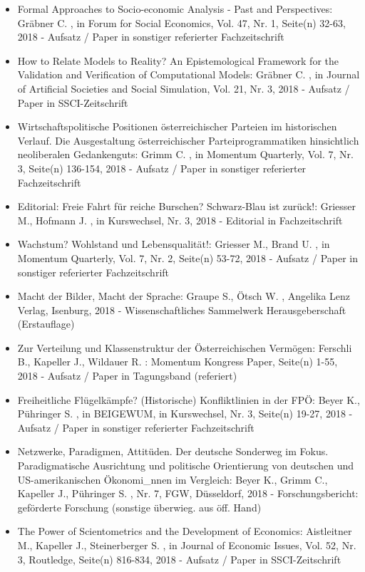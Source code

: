 \begin{itemize}
	 \item Formal Approaches to Socio-economic Analysis - Past and Perspectives: Gräbner C. , in Forum for Social Economics, Vol. 47, Nr. 1, Seite(n) 32-63, 2018 - Aufsatz / Paper in sonstiger referierter Fachzeitschrift
	 \item How to Relate Models to Reality? An Epistemological Framework for the Validation and Verification of Computational Models: Gräbner C. , in Journal of Artificial Societies and Social Simulation, Vol. 21, Nr. 3, 2018 - Aufsatz / Paper in SSCI-Zeitschrift
	 \item Wirtschaftspolitische Positionen österreichischer Parteien im historischen Verlauf. Die Ausgestaltung österreichischer Parteiprogrammatiken hinsichtlich neoliberalen Gedankenguts: Grimm C. , in Momentum Quarterly, Vol. 7, Nr. 3, Seite(n) 136-154, 2018 - Aufsatz / Paper in sonstiger referierter Fachzeitschrift
	 \item Editorial: Freie Fahrt für reiche Burschen? Schwarz-Blau ist zurück!: Griesser M., Hofmann J. , in Kurswechsel, Nr. 3, 2018 - Editorial in Fachzeitschrift
	 \item Wachstum? Wohlstand und Lebensqualität!: Griesser M., Brand U. , in Momentum Quarterly, Vol. 7, Nr. 2, Seite(n) 53-72, 2018 - Aufsatz / Paper in sonstiger referierter Fachzeitschrift
	 \item Macht der Bilder, Macht der Sprache: Graupe S., Ötsch W. , Angelika Lenz Verlag, Isenburg, 2018 - Wissenschaftliches Sammelwerk Herausgeberschaft (Erstauflage)
	 \item Zur Verteilung und Klassenstruktur der Österreichischen Vermögen: Ferschli B., Kapeller J., Wildauer R. : Momentum Kongress Paper, Seite(n) 1-55, 2018 - Aufsatz / Paper in Tagungsband (referiert)
	 \item Freiheitliche Flügelkämpfe? (Historische) Konfliktlinien in der FPÖ: Beyer K., Pühringer S. , in BEIGEWUM, in Kurswechsel, Nr. 3, Seite(n) 19-27, 2018 - Aufsatz / Paper in sonstiger referierter Fachzeitschrift
	 \item Netzwerke, Paradigmen, Attitüden. Der deutsche Sonderweg im Fokus. Paradigmatische Ausrichtung und politische Orientierung von deutschen und US-amerikanischen Ökonomi_nnen im Vergleich: Beyer K., Grimm C., Kapeller J., Pühringer S. , Nr. 7, FGW, Düsseldorf, 2018 - Forschungsbericht: geförderte Forschung (sonstige überwieg. aus öff. Hand)
	 \item The Power of Scientometrics and the Development of Economics: Aistleitner M., Kapeller J., Steinerberger S. , in Journal of Economic Issues, Vol. 52, Nr. 3, Routledge, Seite(n) 816-834, 2018 - Aufsatz / Paper in SSCI-Zeitschrift
\end{itemize} 
